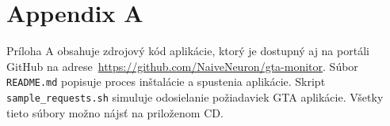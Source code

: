 \chapter*{Appendix A}

Príloha A obsahuje zdrojový kód aplikácie, ktorý je dostupný aj na
portáli GitHub na adrese~\url{https://github.com/NaiveNeuron/gta-monitor}.
Súbor \verb'README.md' popisuje proces inštalácie a spustenia aplikácie. Skript
\verb'sample_requests.sh' simuluje odosielanie požiadaviek GTA aplikácie.
Všetky tieto súbory možno nájsť na priloženom CD.